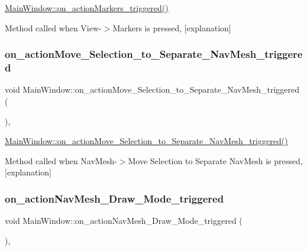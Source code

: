 \hyperlink{class_main_window_addae5ed0b02101880ff1907c4b2c5864}{Main\+Window\+::on\+\_\+action\+Markers\+\_\+triggered()} 

Method called when View-\/$>$Markers is pressed, \mbox{[}explanation\mbox{]} \mbox{\label{class_main_window_a22f2240480e250819d2fbbaf2a6cf13b}} 
\subsubsection{\texorpdfstring{on\+\_\+action\+Move\+\_\+\+Selection\+\_\+to\+\_\+\+Separate\+\_\+\+Nav\+Mesh\+\_\+triggered}{on\_actionMove\_Selection\_to\_Separate\_NavMesh\_triggered}}
{\footnotesize\ttfamily void Main\+Window\+::on\+\_\+action\+Move\+\_\+\+Selection\+\_\+to\+\_\+\+Separate\+\_\+\+Nav\+Mesh\+\_\+triggered (\begin{DoxyParamCaption}{ }\end{DoxyParamCaption})\hspace{0.3cm}{\ttfamily [private]}, {\ttfamily [slot]}}



\hyperlink{class_main_window_a22f2240480e250819d2fbbaf2a6cf13b}{Main\+Window\+::on\+\_\+action\+Move\+\_\+\+Selection\+\_\+to\+\_\+\+Separate\+\_\+\+Nav\+Mesh\+\_\+triggered()} 

Method called when Nav\+Mesh-\/$>$Move Selection to Separate Nav\+Mesh is pressed, \mbox{[}explanation\mbox{]} \mbox{\label{class_main_window_ae9c6d0a50e7481bb627e9602b306a265}} 
\subsubsection{\texorpdfstring{on\+\_\+action\+Nav\+Mesh\+\_\+\+Draw\+\_\+\+Mode\+\_\+triggered}{on\_actionNavMesh\_Draw\_Mode\_triggered}}
{\footnotesize\ttfamily void Main\+Window\+::on\+\_\+action\+Nav\+Mesh\+\_\+\+Draw\+\_\+\+Mode\+\_\+triggered (\begin{DoxyParamCaption}{ }\end{DoxyParamCaption})\hspace{0.3cm}{\ttfamily [private]}, {\ttfamily [slot]}}



